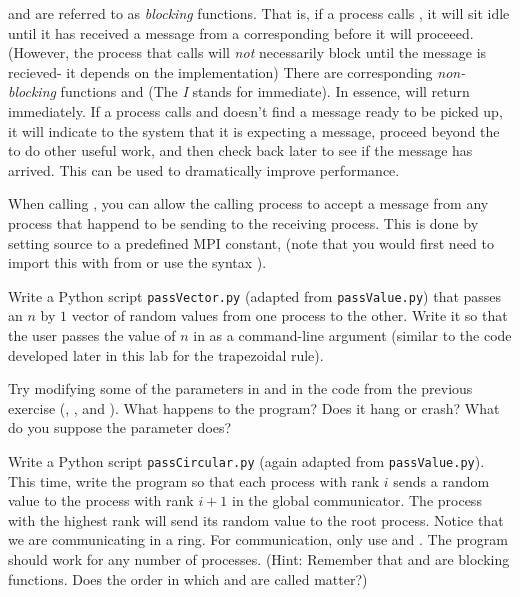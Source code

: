 \begin{info}
 and  are referred to as \emph{blocking} functions. That is, if a process calls , it will sit idle until it has received a message from a corresponding  before it will proceeed. (However, the process that calls  will \emph{not} necessarily block until the message is recieved- it depends on the implementation) There are corresponding \emph{non-blocking} functions  and  (The \emph{I} stands for immediate). In essence,  will return immediately. If a process calls  and doesn't find a message ready to be picked up, it will indicate to the system that it is expecting a message, proceed beyond the  to do other useful work, and then check back later to see if the message has arrived. This can be used to dramatically improve performance.
\end{info}


\begin{info}
When calling , you can allow the calling process to accept a message from any process that happend to be sending to the receiving process. This is done by setting source to a predefined MPI constant,  (note that you would first need to import this with from  or use the syntax ).
\end{info}


\begin{problem}
Write a Python script \texttt{passVector.py} (adapted from \texttt{passValue.py}) that passes an $n$ by $1$ vector of random values from one process to the other. Write it so that the user passes the value of $n$ in as a command-line argument (similar to the code developed later in this lab for the trapezoidal rule).
\end{problem}

\begin{problem}
Try modifying some of the parameters in  and  in the code from the previous exercise (, , and ).  What happens to the program? Does it hang or crash? What do you suppose the  parameter does?
\end{problem}

\begin{problem}
Write a Python script \texttt{passCircular.py} (again adapted from \texttt{passValue.py}). This time, write the program so that each process with rank $i$ sends a random value to the process with rank $i+1$ in the global communicator. The process with the highest rank will send its random value to the root process. Notice that we are communicating in a ring. For communication, only use  and . The program should work for any number of processes. (Hint: Remember that  and  are blocking functions. Does the order in which  and  are called matter?)
\end{problem}


